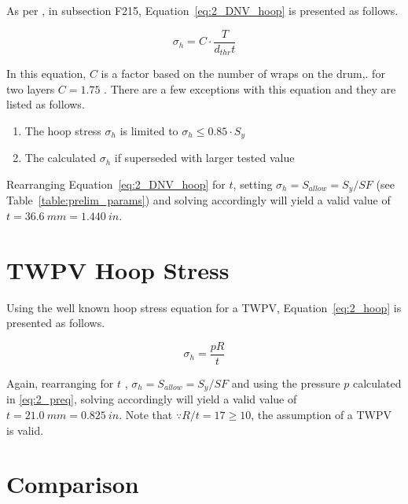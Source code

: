As per \cite{DNVOSD101}, in subsection F215, Equation~\ref{eq:2_DNV_hoop} is presented as follows.

\begin{equation}
	\label{eq:2_DNV_hoop}
	\sigma_h = C\cdot\frac{T}{d_{thr}t}
\end{equation}

In this equation, $C$ is a factor based on the number of wraps on the drum,. for two layers $C=1.75$ \cite{DNVOSD101}. There are a few exceptions with this equation and they are listed as follows.

\begin{enumerate}
	\item The hoop stress $\sigma_h$ is limited to $\sigma_h \leq 0.85\cdot S_y$
	\item The calculated $\sigma_h$  if superseded with larger tested value\\
\end{enumerate}

Rearranging Equation~\ref{eq:2_DNV_hoop} for $t$, setting $\sigma_h = S_{allow}=S_y/SF$ (see Table~\ref{table:prelim_params}) and solving accordingly will yield a valid value of $t = 36.6\ mm = 1.440 \ in$. 

\section{TWPV Hoop Stress}

Using the well known hoop stress equation \cite{roarks} for a TWPV, Equation~\ref{eq:2_hoop} is presented as follows.

\begin{equation}
	\label{eq:2_hoop}
	\sigma_h = \frac{pR}{t}
\end{equation}

Again, rearranging for $t$ , $\sigma_h = S_{allow}=S_y/SF$ and using the pressure $p$ calculated in \ref{eq:2_preq}, solving accordingly will yield a valid value of $t = 21.0\ mm = 0.825 \ in$. Note that $\because R/t = 17 \geq 10$, the assumption of a TWPV is valid.

\section{Comparison}

